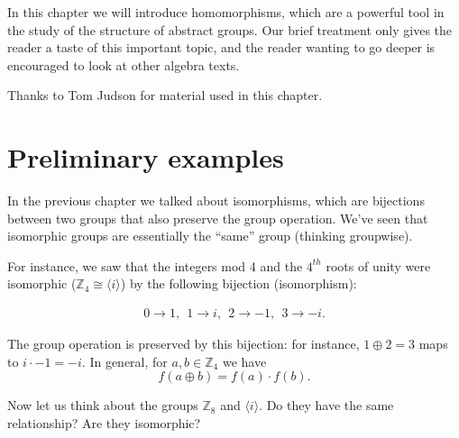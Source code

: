 



In this chapter we will introduce homomorphisms, which are a powerful tool in the study of the structure of abstract groups. Our brief treatment only gives the reader a taste of this important topic, and the reader wanting to go deeper is encouraged to look at other algebra texts.
\bigskip

Thanks to Tom Judson for material used in this chapter.
 
\section{Preliminary examples}\label{homomorph_defn_ex}

  
In the previous chapter we talked about isomorphisms, which are bijections between two groups that also preserve
the group operation. We've seen that isomorphic groups are essentially the ``same'' group (thinking groupwise). 

For instance, we saw that the integers mod 4 and the $4^{th}$ roots of unity were isomorphic (${\mathbb Z_4} \cong \langle i \rangle$)  by the following bijection (isomorphism):

\begin{align*}
    0 \rightarrow 1 ,~~     1 \rightarrow i,~~    2 \rightarrow -1,~~   3 \rightarrow -i.
\end{align*}

The group operation is preserved by this bijection:  for instance, $1  \oplus 2=3$ maps to 
$i \cdot -1 = -i$.
In general, for $a,b \in {\mathbb Z_4}$ we have
$$f(a \oplus b) = f(a) \cdot f(b).$$

 Now let us think about the groups \emph{ ${\mathbb Z_8}$} and $\langle i \rangle$.  Do they have the same relationship?  Are they isomorphic? 

